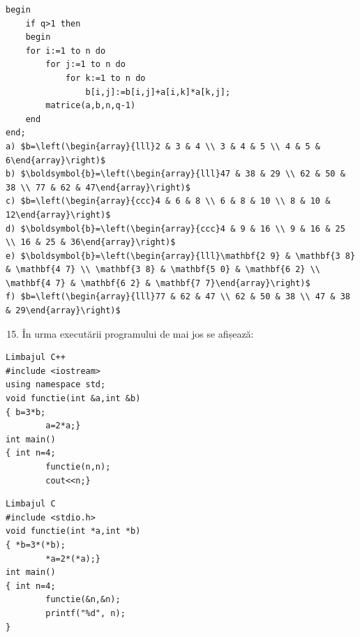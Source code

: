 \documentclass[10pt]{article}
\begin{document}
\begin{verbatim}
begin
    if q>1 then
    begin
    for i:=1 to n do
        for j:=1 to n do
            for k:=1 to n do
                b[i,j]:=b[i,j]+a[i,k]*a[k,j];
        matrice(a,b,n,q-1)
    end
end;
a) $b=\left(\begin{array}{lll}2 & 3 & 4 \\ 3 & 4 & 5 \\ 4 & 5 & 6\end{array}\right)$
b) $\boldsymbol{b}=\left(\begin{array}{lll}47 & 38 & 29 \\ 62 & 50 & 38 \\ 77 & 62 & 47\end{array}\right)$
c) $b=\left(\begin{array}{ccc}4 & 6 & 8 \\ 6 & 8 & 10 \\ 8 & 10 & 12\end{array}\right)$
d) $\boldsymbol{b}=\left(\begin{array}{ccc}4 & 9 & 16 \\ 9 & 16 & 25 \\ 16 & 25 & 36\end{array}\right)$
е) $\boldsymbol{b}=\left(\begin{array}{lll}\mathbf{2 9} & \mathbf{3 8} & \mathbf{4 7} \\ \mathbf{3 8} & \mathbf{5 0} & \mathbf{6 2} \\ \mathbf{4 7} & \mathbf{6 2} & \mathbf{7 7}\end{array}\right)$
f) $b=\left(\begin{array}{lll}77 & 62 & 47 \\ 62 & 50 & 38 \\ 47 & 38 & 29\end{array}\right)$
\end{verbatim}

\begin{enumerate}
  \setcounter{enumi}{14}
  \item În urma executării programului de mai jos se afișează:
\end{enumerate}

\begin{verbatim}
Limbajul C++
#include <iostream>
using namespace std;
void functie(int &a,int &b)
{ b=3*b;
        a=2*a;}
int main()
{ int n=4;
        functie(n,n);
        cout<<n;}
\end{verbatim}

\begin{verbatim}
Limbajul C
#include <stdio.h>
void functie(int *a,int *b)
{ *b=3*(*b);
        *a=2*(*a);}
int main()
{ int n=4;
        functie(&n,&n);
        printf("%d", n);
}
\end{verbatim}
\end{document}
